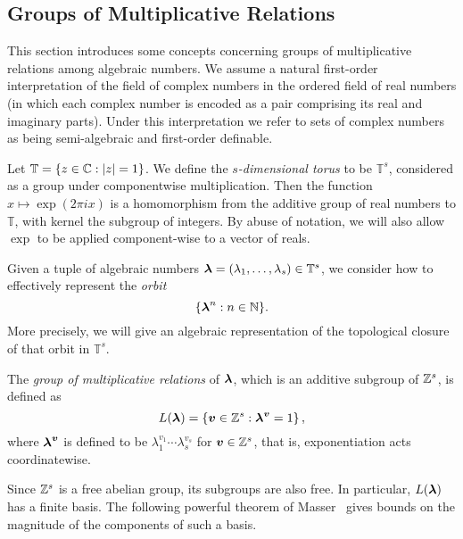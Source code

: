 \subsection{Groups of Multiplicative Relations}
\label{sec:mult}

This section introduces some concepts concerning groups of multiplicative relations among algebraic numbers. We assume a natural first-order interpretation of the field of complex numbers in the ordered field of real numbers (in which each complex number is encoded as a pair comprising its real and imaginary parts). Under this interpretation we refer to sets of complex numbers as being semi-algebraic and first-order definable.

Let $\mathbb{T}=\lbrace z \in \mathbb{C}: \lvert z \rvert = 1 \rbrace$. We define the \emph{$s$-dimensional torus} to be $\mathbb{T}^s$, considered as a group under componentwise multiplication. Then the function $x \mapsto \exp(2 \pi i x)$ is a homomorphism from the additive group of real numbers to $\mathbb{T}$, with kernel the subgroup of integers. By abuse of notation, we will also allow $\exp$ to be applied component-wise to a vector of reals.

Given a tuple of algebraic numbers $\boldsymbol{\lambda} = (\lambda_{1}, \ldots, \lambda_{s}) \in \mathbb{T}^{s}$, we consider how to effectively represent the \emph{orbit}
\begin{equation*}
\lbrace \boldsymbol{\lambda}^{n} : n \in \mathbb{N} \rbrace.
\end{equation*}
More precisely, we will give an algebraic representation of the topological closure of that orbit in $\mathbb{T}^s$.

The \emph{group of multiplicative relations} of $\boldsymbol{\lambda}$, which is an additive subgroup of $\mathbb{Z}^s$, is defined as
\begin{equation*}
L(\boldsymbol{\lambda})=\lbrace \boldsymbol{v}\in \mathbb{Z}^s : \boldsymbol\lambda^{\boldsymbol v}=1 \rbrace \, ,
\end{equation*}
where $\boldsymbol\lambda^{\boldsymbol v}$ is defined to be $\lambda_1^{v_1}\cdots\lambda_s^{v_s}$ for $\boldsymbol{v}\in \mathbb{Z}^s$, that is, exponentiation acts coordinatewise.

Since $\mathbb{Z}^s$ is a free abelian group, its subgroups are also
free.  In particular, $L(\boldsymbol\lambda)$ has a finite basis. The
following powerful theorem of Masser~\cite{Mas88} gives bounds on the
magnitude of the components of such a basis.

